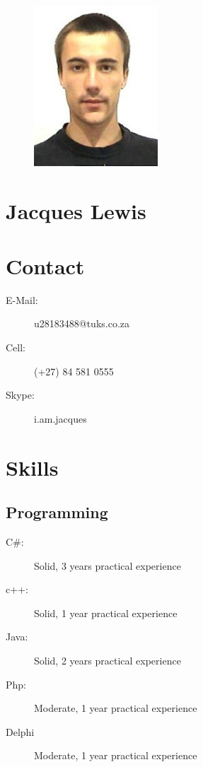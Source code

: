 \documentclass[a4paper]{article}
\begin{document}
\begin{center}
	\begin{figure}[H]
		\centering
		\includegraphics[height=6cm]{jacques}
	\end{figure}
\end{center}

\section*
{
	\Huge{Jacques Lewis}
}
\vspace{0.5cm}

\section*{Contact}
	\begin{description}
		\item[E-Mail:] u28183488@tuks.co.za
		\item[Cell:] (+27) 84 581 0555
		\item[Skype:] i.am.jacques
	\end{description}

\section*{Skills}

	\subsection*{Programming}
		\begin{description}
			\item[C\#:]Solid, 3 years practical experience
			\item[c++:]Solid, 1 year practical experience
			\item[Java:]Solid, 2 years practical experience
			\item[Php:]Moderate, 1 year practical experience
			\item[Delphi]Moderate, 1 year practical experience
		\end{description}
\end{document}
